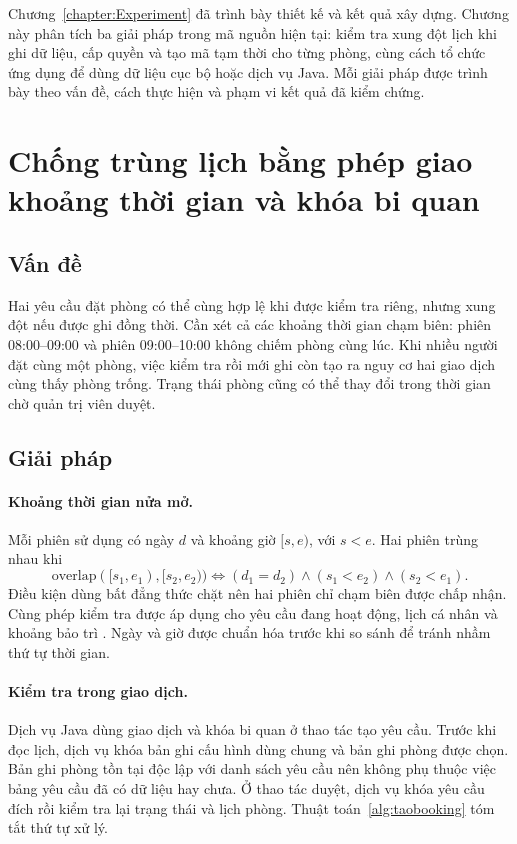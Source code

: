 \documentclass[../DoAn.tex]{subfiles}
\begin{document}
Chương~\ref{chapter:Experiment} đã trình bày thiết kế và kết quả xây dựng. Chương này phân tích ba giải pháp trong mã nguồn hiện tại: kiểm tra xung đột lịch khi ghi dữ liệu, cấp quyền và tạo mã tạm thời cho từng phòng, cùng cách tổ chức ứng dụng để dùng dữ liệu cục bộ hoặc dịch vụ Java. Mỗi giải pháp được trình bày theo vấn đề, cách thực hiện và phạm vi kết quả đã kiểm chứng.

\section{Chống trùng lịch bằng phép giao khoảng thời gian và khóa bi quan}
\label{section:5.1}

\subsection{Vấn đề}
Hai yêu cầu đặt phòng có thể cùng hợp lệ khi được kiểm tra riêng, nhưng xung đột nếu được ghi đồng thời. Cần xét cả các khoảng thời gian chạm biên: phiên 08:00--09:00 và phiên 09:00--10:00 không chiếm phòng cùng lúc. Khi nhiều người đặt cùng một phòng, việc kiểm tra rồi mới ghi còn tạo ra nguy cơ hai giao dịch cùng thấy phòng trống. Trạng thái phòng cũng có thể thay đổi trong thời gian chờ quản trị viên duyệt.

\subsection{Giải pháp}
\paragraph{Khoảng thời gian nửa mở.} Mỗi phiên sử dụng có ngày $d$ và khoảng giờ $[s,e)$, với $s<e$. Hai phiên trùng nhau khi
\begin{equation}\label{eq:overlap}
\mathrm{overlap}([s_1,e_1),[s_2,e_2))
\iff (d_1=d_2)\land(s_1<e_2)\land(s_2<e_1).
\end{equation}
Điều kiện dùng bất đẳng thức chặt nên hai phiên chỉ chạm biên được chấp nhận. Cùng phép kiểm tra được áp dụng cho yêu cầu đang hoạt động, lịch cá nhân và khoảng bảo trì \cite{allen1983interval}. Ngày và giờ được chuẩn hóa trước khi so sánh để tránh nhầm thứ tự thời gian.

\paragraph{Kiểm tra trong giao dịch.} Dịch vụ Java dùng giao dịch và khóa bi quan ở thao tác tạo yêu cầu. Trước khi đọc lịch, dịch vụ khóa bản ghi cấu hình dùng chung và bản ghi phòng được chọn. Bản ghi phòng tồn tại độc lập với danh sách yêu cầu nên không phụ thuộc việc bảng yêu cầu đã có dữ liệu hay chưa. Ở thao tác duyệt, dịch vụ khóa yêu cầu đích rồi kiểm tra lại trạng thái và lịch phòng. Thuật toán~\ref{alg:taobooking} tóm tắt thứ tự xử lý.
\end{document}
